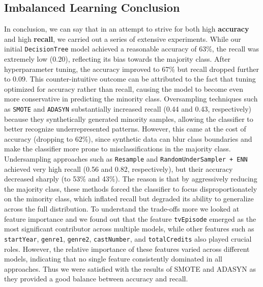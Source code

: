 \subsection{Imbalanced Learning Conclusion}
In conclusion, we can say that in an attempt to strive for both high \textbf{accuracy} and high \textbf{recall}, 
we carried out a series of extensive experiments. While our initial \texttt{DecisionTree} model achieved a reasonable accuracy of 63\%, 
the recall was extremely low (0.20), reflecting its bias towards the majority class. 
After hyperparameter tuning, the accuracy improved to 67\% but recall dropped further to 0.09. 
This counter-intuitive outcome can be attributed to the fact that tuning optimized for accuracy rather than recall, 
causing the model to become even more conservative in predicting the minority class. 
Oversampling techniques such as \texttt{SMOTE} and \texttt{ADASYN} substantially increased recall (0.44 and 0.43, respectively) 
because they synthetically generated minority samples, allowing the classifier to better recognize underrepresented patterns. 
However, this came at the cost of accuracy (dropping to 62\%), since synthetic data can blur class boundaries and make the classifier 
more prone to misclassifications in the majority class.  
Undersampling approaches such as \texttt{Resample} and \texttt{RandomUnderSampler + ENN} achieved very high recall (0.56 and 0.82, respectively), 
but their accuracy decreased sharply (to 53\% and 43\%). The reason is that by aggressively reducing the majority class, 
these methods forced the classifier to focus disproportionately on the minority class, which inflated recall but degraded its ability to 
generalize across the full distribution.  
To understand the trade-offs more we looked at feature importance and we found out that the feature \texttt{tvEpisode} emerged as the 
most significant contributor across multiple models, 
while other features such as \texttt{startYear}, \texttt{genre1}, \texttt{genre2}, \texttt{castNumber}, and \texttt{totalCredits} also played crucial roles. 
However, the relative importance of these features varied across different models, indicating that no single feature consistently dominated in all approaches. 
Thus we were satisfied with the results of SMOTE and ADASYN as they provided a good balance between accuracy and recall.
